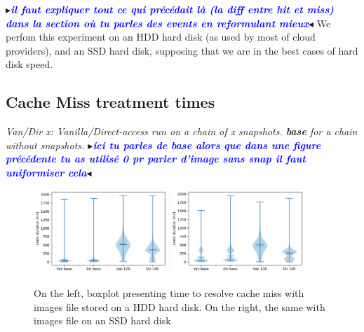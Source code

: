 \documentclass[sigplan,screen,10pt]{acmart}
\newcommand{\mynote}[2]{\fbox{\bfseries\sffamily\footnotesize{\textbf{#1}}}
 {\small$\blacktriangleright$\textsf{\emph{#2}}$\blacktriangleleft$}}
\newcommand{\mynote}[2]{}
\newcommand{\stella}[1]{\mynote{\textcolor{red}{Stella}}{\textcolor{blue}{\textbf{#1}}}}
\begin{document}
	\stella{il faut expliquer tout ce qui précédait là (la diff entre hit et miss) dans la section où tu parles des events en reformulant mieux}
	We perfom this experiment on an HDD hard disk (as used by most of cloud providers), and an SSD hard disk, supposing that we are in the best cases of hard disk speed.
	
	\subsection*{Cache Miss treatment times}
	
	\textit{Van/Dir x: Vanilla/Direct-access run on a chain of x snapshots. \textbf{base} for a chain without snapshots. \stella{ici tu parles de base alors que dans une figure précédente tu as utilisé 0 pr parler d'image sans snap il faut uniformiser cela}}
	\begin{figure}[h]
		\center
		\includegraphics[width=0.45\textwidth]{MISSED_time_hdd.pdf}
		\includegraphics[width=0.45\textwidth]{MISSED_time_ssd.pdf}
		\caption{On the left, boxplot presenting time to resolve cache miss with images file stored on a HDD hard disk. On the right, the same with images file on an SSD hard disk}
		\label{fig:fig-a}
	\end{figure}
\end{document}
